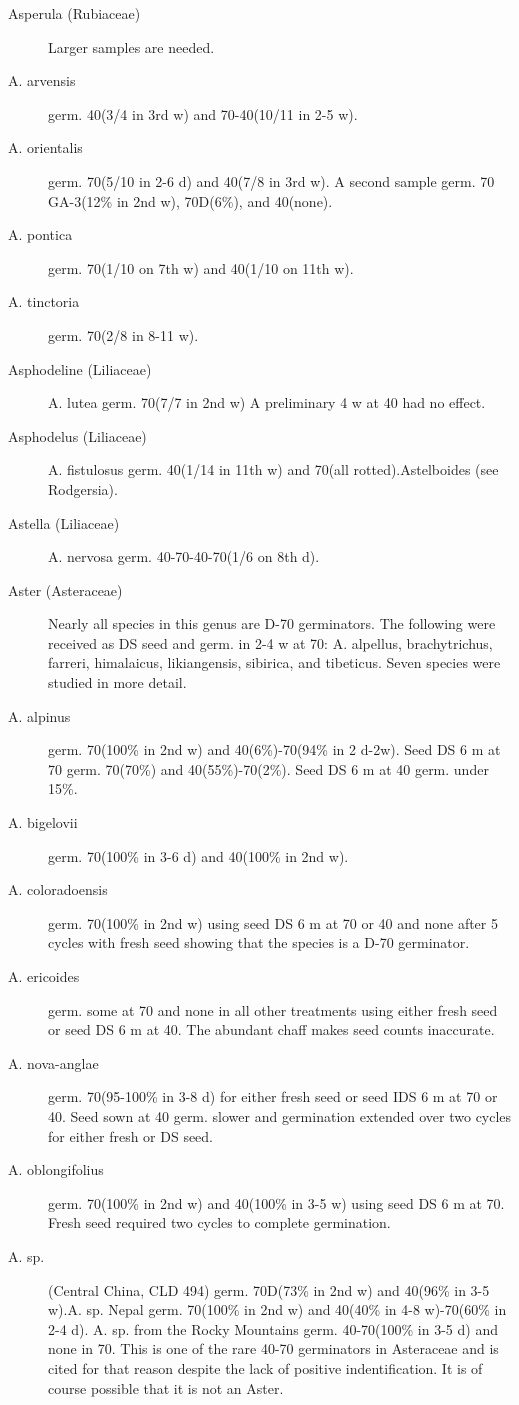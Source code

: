 \begin{description}
\item[Asperula (Rubiaceae)] Larger samples are needed.
\item[A. arvensis] germ. 40(3/4 in 3rd w) and 70-40(10/11 in 2-5 w).
\item[A. orientalis] germ. 70(5/10 in 2-6 d) and 40(7/8 in 3rd w). A second sample
germ. 70 GA-3(12\% in 2nd w), 70D(6\%), and 40(none).
\item[A. pontica] germ. 70(1/10 on 7th w) and 40(1/10 on 11th w).
\item[A. tinctoria] germ. 70(2/8 in 8-11 w).

\item[Asphodeline (Liliaceae)] A. lutea germ. 70(7/7 in 2nd w) A preliminary 4
w at 40 had no effect.
\item[Asphodelus (Liliaceae)] A. fistulosus germ. 40(1/14 in 11th w) and 70(all
rotted).Astelboides (see Rodgersia).
\item[Astella (Liliaceae)] A. nervosa germ. 40-70-40-70(1/6 on 8th d).
\item[Aster (Asteraceae)] Nearly all species in this genus are D-70 germinators.
The following were received as DS seed and germ. in 2-4 w at 70: A. alpellus,
brachytrichus, farreri, himalaicus, likiangensis, sibirica, and tibeticus. Seven species
were studied in more detail.

\item[A. alpinus] germ. 70(100\% in 2nd w) and 40(6\%)-70(94\% in 2 d-2w). Seed DS
6 m at 70 germ. 70(70\%) and 40(55\%)-70(2\%). Seed DS 6 m at 40 germ. under 15\%.
\item[A. bigelovii] germ. 70(100\% in 3-6 d) and 40(100\% in 2nd w).
\item[A. coloradoensis] germ. 70(100\% in 2nd w) using seed DS 6 m at 70 or 40 and
none after 5 cycles with fresh seed showing that the species is a D-70 germinator.
\item[A. ericoides] germ. some at 70 and none in all other treatments using either
fresh seed or seed DS 6 m at 40. The abundant chaff makes seed counts inaccurate.
\item[A. nova-anglae] germ. 70(95-100\% in 3-8 d) for either fresh seed or seed IDS 6
m at 70 or 40. Seed sown at 40 germ. slower and germination extended over two
cycles for either fresh or DS seed.
\item[A. oblongifolius] germ. 70(100\% in 2nd w) and 40(100\% in 3-5 w) using seed
DS 6 m at 70. Fresh seed required two cycles to complete germination.
\item[A. sp.] (Central China, CLD 494) germ. 70D(73\% in 2nd w) and 40(96\% in
3-5 w).A. sp. Nepal germ. 70(100\% in 2nd w) and 40(40\% in 4-8 w)-70(60\% in 2-4 d).
A. sp. from the Rocky Mountains germ. 40-70(100\% in 3-5 d) and none in 70.
This is one of the rare 40-70 germinators in Asteraceae and is cited for that reason
despite the lack of positive indentification. It is of course possible that it is not an Aster.


\end{description}

